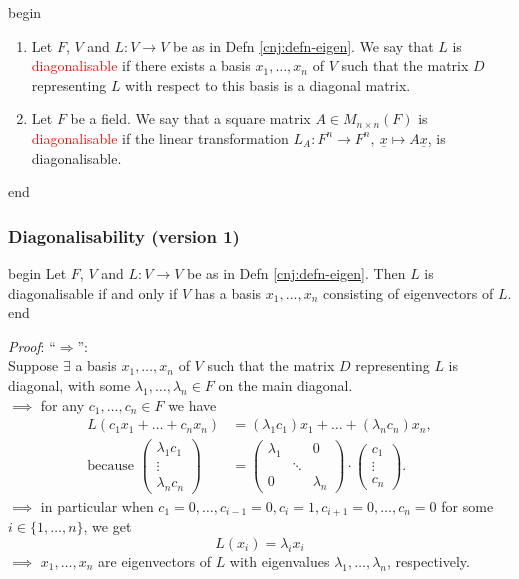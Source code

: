 \documentclass[
  12pt,
  a4paper,
  twoside]{article}
\theoremstyle{plain}
\theoremstyle{definition}
\begin{document}
\csname begin\label{cnj:defn-diag}

\begin{enumerate}
\def\labelenumi{(\alph{enumi})}
\item
  Let \(F\), \(V\) and \(L: V \rightarrow V\) be as in Defn \ref{cnj:defn-eigen}. We say that \(L\) is \textcolor{red}{diagonalisable} if there exists a basis \(x_{1} , \dots, x_{n}\) of \(V\) such that the matrix \(D\) representing \(L\) with respect to this basis is a diagonal matrix.
\item
  Let \(F\) be a field. We say that a square matrix \(A \in M_{n \times n}(F)\) is \textcolor{red}{diagonalisable} if the linear transformation \(L_{A} : F^{n} \to F^{n}, \ \underline{x} \mapsto A \underline{x}\), is diagonalisable.
\end{enumerate}

\csname end

\hypertarget{sss-diag-v1}{%
\subsubsection{Diagonalisability (version 1)}\label{sss-diag-v1}}

\csname begin\label{cnj:prop-eigenbasis}
Let \(F\), \(V\) and \(L: V \rightarrow V\) be as in Defn \ref{cnj:defn-eigen}. Then \(L\) is diagonalisable if and only if \(V\) has a basis \(x_{1}, \dots, x_{n}\) consisting of eigenvectors of \(L\).
\csname end

\emph{Proof}: ``\(\Longrightarrow\)'':\\
Suppose \(\exists\) a basis \(x_{1}, \dots, x_{n}\) of \(V\) such that the matrix \(D\) representing \(L\) is diagonal, with some \(\lambda_{1}, \dots, \lambda_{n} \in F\) on the main diagonal.\\
\(\implies\) for any \(c_1,\dots,c_n\in F\) we have
\begin{align*}
L(c_1x_1+\dots+c_nx_n) &= (\lambda_1c_1)x_1+\dots+(\lambda_nc_n)x_n,\\
\text{because }\begin{pmatrix}\lambda_1c_1\\ \vdots \\ \lambda_nc_n\end{pmatrix} &= \begin{pmatrix} \lambda_{1} & & 0 \\ & \ddots & \\ 0 & & \lambda_{n} \end{pmatrix}\cdot \begin{pmatrix}c_1\\ \vdots\\ c_n\end{pmatrix}.
\end{align*}
\(\implies\) in particular when \(c_1=0,\dots,c_{i-1}=0,c_i=1,c_{i+1}=0,\dots,c_n=0\) for some \(i\in\{1,\dots,n\}\), we get
\[
L(x_i)=\lambda_i x_i
\]
\(\implies\) \(x_{1}, \dots, x_{n}\) are eigenvectors of \(L\) with eigenvalues \(\lambda_{1}, \dots, \lambda_{n}\), respectively.
\end{document}
